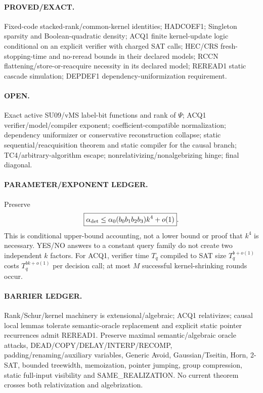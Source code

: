 \documentclass[11pt]{article}
\begin{document}
\paragraph{PROVED/EXACT.} Fixed-code stacked-rank/common-kernel identities; HADCOEF1; Singleton sparsity and Boolean-quadratic density; ACQ1 finite kernel-update logic conditional on an explicit verifier with charged SAT calls; HEC/CRS fresh-stopping-time and no-reread bounds in their declared models; RCCN flattening/store-or-reacquire necessity in its declared model; REREAD1 static cascade simulation; DEPDEF1 dependency-uniformization requirement.

\paragraph{OPEN.} Exact active SU09/vMS label-bit functions and rank of \(\Psi\); ACQ1 verifier/model/compiler exponent; coefficient-compatible normalization; dependency uniformizer or conservative reconstruction collapse; static sequential/reacquisition theorem and static compiler for the causal branch; TC4/arbitrary-algorithm escape; nonrelativizing/nonalgebrizing hinge; final diagonal.

\paragraph{PARAMETER/EXPONENT LEDGER.} Preserve
\[
\boxed{\alpha_{\rm det}\le\alpha_0(b_0b_1b_2b_3)k^4+o(1)}.
\]
This is conditional upper-bound accounting, not a lower bound or proof that \(k^4\) is necessary. YES/NO answers to a constant query family do not create two independent \(k\) factors. For ACQ1, verifier time \(T_q\) compiled to SAT size \(T_q^{b+o(1)}\) costs \(T_q^{bk+o(1)}\) per decision call; at most \(M\) successful kernel-shrinking rounds occur.

\paragraph{BARRIER LEDGER.} Rank/Schur/kernel machinery is extensional/algebraic; ACQ1 relativizes; causal local lemmas tolerate semantic-oracle replacement and explicit static pointer recurrences admit REREAD1. Preserve maximal semantic/algebraic oracle attacks, DEAD/COPY/DELAY/INTERP/RECOMP, padding/renaming/auxiliary variables, Generic Avoid, Gaussian/Tseitin, Horn, 2-SAT, bounded treewidth, memoization, pointer jumping, group compression, static full-input visibility and SAME_REALIZATION. No current theorem crosses both relativization and algebrization.
\end{document}
